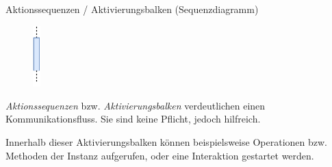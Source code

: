 \begin{defi}{Aktionssequenzen / Aktivierungsbalken (Sequenzdiagramm)}
    \begin{figure}
        \centering
        \includegraphics[width=0.025\textwidth]{includes/figures/defi_diagrams_sequenz_aktion.pdf}
    \end{figure}
    \emph{Aktionssequenzen} bzw. \emph{Aktivierungsbalken} verdeutlichen einen Kommunikationsfluss.
    Sie sind keine Pflicht, jedoch hilfreich.

    Innerhalb dieser Aktivierungsbalken können beispielsweise Operationen bzw. Methoden der Instanz aufgerufen, oder eine Interaktion gestartet werden.

    \vspace{1cm}
\end{defi}

